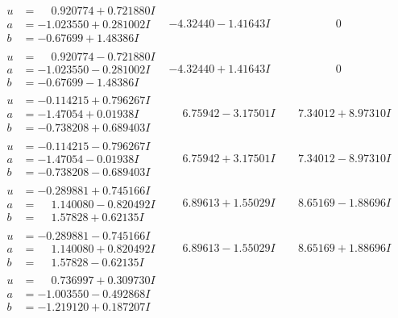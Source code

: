 \documentclass[1p]{elsarticle_modified}
\theoremstyle{definition}
\begin{document}
$$\begin{array}{c|c|c}
\begin{aligned}
u &= \phantom{-}0.920774 + 0.721880 I \\
a &= -1.023550 + 0.281002 I \\
b &= -0.67699 + 1.48386 I\end{aligned}
 & -4.32440 - 1.41643 I & \phantom{-0.000000 } 0 \\ \hline\begin{aligned}
u &= \phantom{-}0.920774 - 0.721880 I \\
a &= -1.023550 - 0.281002 I \\
b &= -0.67699 - 1.48386 I\end{aligned}
 & -4.32440 + 1.41643 I & \phantom{-0.000000 } 0 \\ \hline\begin{aligned}
u &= -0.114215 + 0.796267 I \\
a &= -1.47054 + 0.01938 I \\
b &= -0.738208 + 0.689403 I\end{aligned}
 & \phantom{-}6.75942 - 3.17501 I & \phantom{-}7.34012 + 8.97310 I \\ \hline\begin{aligned}
u &= -0.114215 - 0.796267 I \\
a &= -1.47054 - 0.01938 I \\
b &= -0.738208 - 0.689403 I\end{aligned}
 & \phantom{-}6.75942 + 3.17501 I & \phantom{-}7.34012 - 8.97310 I \\ \hline\begin{aligned}
u &= -0.289881 + 0.745166 I \\
a &= \phantom{-}1.140080 - 0.820492 I \\
b &= \phantom{-}1.57828 + 0.62135 I\end{aligned}
 & \phantom{-}6.89613 + 1.55029 I & \phantom{-}8.65169 - 1.88696 I \\ \hline\begin{aligned}
u &= -0.289881 - 0.745166 I \\
a &= \phantom{-}1.140080 + 0.820492 I \\
b &= \phantom{-}1.57828 - 0.62135 I\end{aligned}
 & \phantom{-}6.89613 - 1.55029 I & \phantom{-}8.65169 + 1.88696 I \\ \hline\begin{aligned}
u &= \phantom{-}0.736997 + 0.309730 I \\
a &= -1.003550 - 0.492868 I \\
b &= -1.219120 + 0.187207 I\end{aligned}

\end{array}$$
\end{document}
